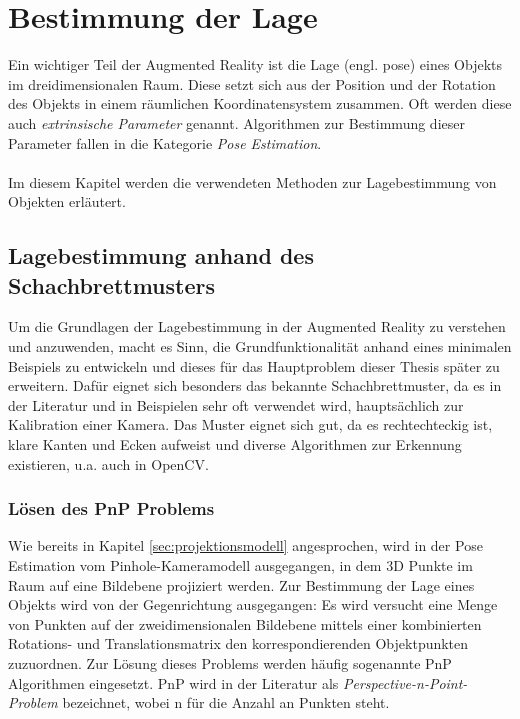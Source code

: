 \chapter{Bestimmung der Lage}
\label{chap:projektion}

Ein wichtiger Teil der Augmented Reality ist die Lage (engl. pose) eines Objekts im dreidimensionalen Raum. Diese setzt sich aus der Position und der Rotation des Objekts in einem räumlichen Koordinatensystem zusammen. Oft werden diese auch \textit{extrinsische Parameter} genannt. Algorithmen zur Bestimmung dieser Parameter fallen in die Kategorie \textit{Pose Estimation}.
\\
\\
Im diesem Kapitel werden die verwendeten Methoden zur Lagebestimmung von Objekten erläutert.


\section{Lagebestimmung anhand des Schachbrettmusters}


Um die Grundlagen der Lagebestimmung in der Augmented Reality zu verstehen und anzuwenden, macht es Sinn, die Grundfunktionalität anhand eines minimalen Beispiels zu entwickeln und dieses für das Hauptproblem dieser Thesis später zu erweitern. Dafür eignet sich besonders das bekannte Schachbrettmuster, da es in der Literatur und in Beispielen sehr oft verwendet wird, hauptsächlich zur Kalibration einer Kamera. Das Muster eignet sich gut, da es rechtechteckig ist, klare Kanten und Ecken aufweist und diverse Algorithmen zur Erkennung existieren, u.a. auch in OpenCV.

\subsection{Lösen des PnP Problems}

Wie bereits in Kapitel \ref{sec:projektionsmodell} angesprochen, wird in der Pose Estimation vom Pinhole-Kameramodell ausgegangen, in dem 3D Punkte im Raum auf eine Bildebene projiziert werden. Zur Bestimmung der Lage eines Objekts wird von der Gegenrichtung ausgegangen: Es wird versucht eine Menge von Punkten auf der zweidimensionalen Bildebene mittels einer kombinierten Rotations- und Translationsmatrix den korrespondierenden Objektpunkten zuzuordnen. Zur Lösung dieses Problems werden häufig sogenannte PnP Algorithmen eingesetzt. PnP wird in der Literatur als \textit{Perspective-n-Point-Problem} bezeichnet, wobei n für die Anzahl an Punkten steht. 

